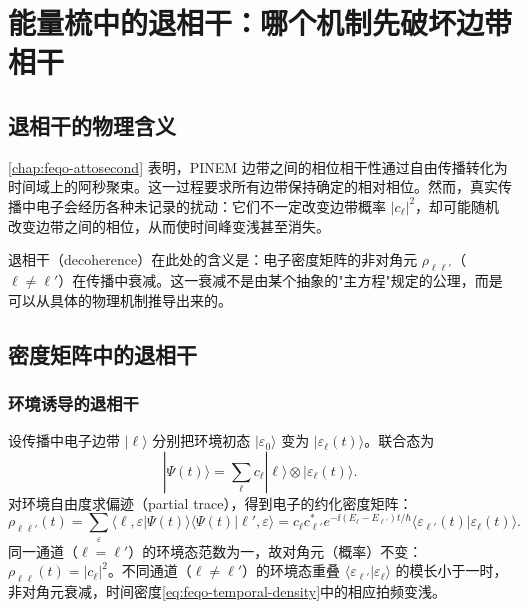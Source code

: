 \section{能量梳中的退相干：哪个机制先破坏边带相干}
\label{chap:feqo-decoherence}

\subsection{退相干的物理含义}

\cref{chap:feqo-attosecond} 表明，PINEM 边带之间的相位相干性通过自由传播转化为时间域上的阿秒聚束。这一过程要求所有边带保持确定的相对相位。然而，真实传播中电子会经历各种未记录的扰动：它们不一定改变边带概率 $|c_\ell|^2$，却可能随机改变边带之间的相位，从而使时间峰变浅甚至消失。

退相干（decoherence）在此处的含义是：电子密度矩阵的非对角元 $\rho_{\ell\ell'}$（$\ell\neq\ell'$）在传播中衰减。这一衰减不是由某个抽象的"主方程"规定的公理，而是可以从具体的物理机制推导出来的。

\subsection{密度矩阵中的退相干}

\subsubsection{环境诱导的退相干}

设传播中电子边带 $|\ell\rangle$ 分别把环境初态 $|\varepsilon_0\rangle$ 变为 $|\varepsilon_\ell(t)\rangle$。联合态为
\begin{equation}
|\Psi(t)\rangle=\sum_\ell c_\ell|\ell\rangle\otimes|\varepsilon_\ell(t)\rangle.
\label{eq:feqo-joint-state}
\end{equation}
对环境自由度求偏迹（partial trace），得到电子的约化密度矩阵：
\begin{equation}
\rho_{\ell\ell'}(t)=\sum_{\varepsilon}\langle\ell,\varepsilon|\Psi(t)\rangle\langle\Psi(t)|\ell',\varepsilon\rangle
=c_\ell c_{\ell'}^*e^{-\ii(E_\ell-E_{\ell'})t/\hbar}
\langle\varepsilon_{\ell'}(t)|\varepsilon_\ell(t)\rangle.
\label{eq:feqo-decoherence-factor}
\end{equation}
同一通道（$\ell=\ell'$）的环境态范数为一，故对角元（概率）不变：$\rho_{\ell\ell}(t)=|c_\ell|^2$。不同通道（$\ell\neq\ell'$）的环境态重叠 $\langle\varepsilon_{\ell'}|\varepsilon_\ell\rangle$ 的模长小于一时，非对角元衰减，时间密度\cref{eq:feqo-temporal-density}中的相应拍频变浅。

